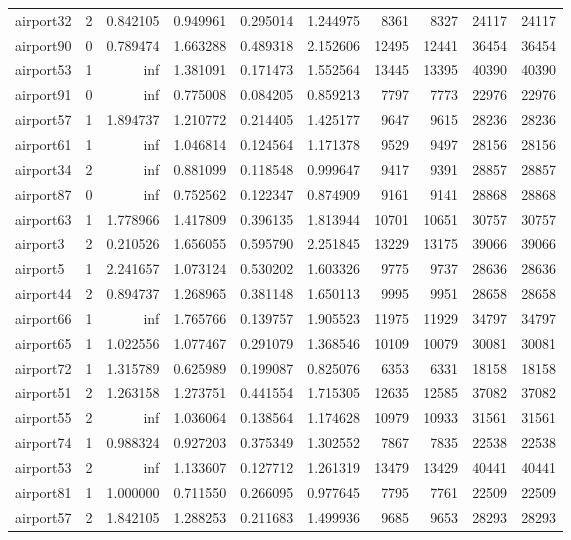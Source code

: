 \begin{longtable}{|l|r|r|r|r|r|r|r|r|r|}
airport32 & 2 & 0.842105 & 0.949961 & 0.295014 & 1.244975 & 8361 & 8327 & 24117 & 24117 \\
airport90 & 0 & 0.789474 & 1.663288 & 0.489318 & 2.152606 & 12495 & 12441 & 36454 & 36454 \\
airport53 & 1 & inf & 1.381091 & 0.171473 & 1.552564 & 13445 & 13395 & 40390 & 40390 \\
airport91 & 0 & inf & 0.775008 & 0.084205 & 0.859213 & 7797 & 7773 & 22976 & 22976 \\
airport57 & 1 & 1.894737 & 1.210772 & 0.214405 & 1.425177 & 9647 & 9615 & 28236 & 28236 \\
airport61 & 1 & inf & 1.046814 & 0.124564 & 1.171378 & 9529 & 9497 & 28156 & 28156 \\
airport34 & 2 & inf & 0.881099 & 0.118548 & 0.999647 & 9417 & 9391 & 28857 & 28857 \\
airport87 & 0 & inf & 0.752562 & 0.122347 & 0.874909 & 9161 & 9141 & 28868 & 28868 \\
airport63 & 1 & 1.778966 & 1.417809 & 0.396135 & 1.813944 & 10701 & 10651 & 30757 & 30757 \\
airport3 & 2 & 0.210526 & 1.656055 & 0.595790 & 2.251845 & 13229 & 13175 & 39066 & 39066 \\
airport5 & 1 & 2.241657 & 1.073124 & 0.530202 & 1.603326 & 9775 & 9737 & 28636 & 28636 \\
airport44 & 2 & 0.894737 & 1.268965 & 0.381148 & 1.650113 & 9995 & 9951 & 28658 & 28658 \\
airport66 & 1 & inf & 1.765766 & 0.139757 & 1.905523 & 11975 & 11929 & 34797 & 34797 \\
airport65 & 1 & 1.022556 & 1.077467 & 0.291079 & 1.368546 & 10109 & 10079 & 30081 & 30081 \\
airport72 & 1 & 1.315789 & 0.625989 & 0.199087 & 0.825076 & 6353 & 6331 & 18158 & 18158 \\
airport51 & 2 & 1.263158 & 1.273751 & 0.441554 & 1.715305 & 12635 & 12585 & 37082 & 37082 \\
airport55 & 2 & inf & 1.036064 & 0.138564 & 1.174628 & 10979 & 10933 & 31561 & 31561 \\
airport74 & 1 & 0.988324 & 0.927203 & 0.375349 & 1.302552 & 7867 & 7835 & 22538 & 22538 \\
airport53 & 2 & inf & 1.133607 & 0.127712 & 1.261319 & 13479 & 13429 & 40441 & 40441 \\
airport81 & 1 & 1.000000 & 0.711550 & 0.266095 & 0.977645 & 7795 & 7761 & 22509 & 22509 \\
airport57 & 2 & 1.842105 & 1.288253 & 0.211683 & 1.499936 & 9685 & 9653 & 28293 & 28293 \\

\end{longtable}
